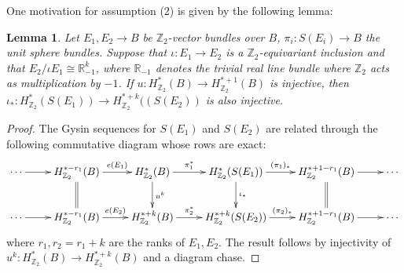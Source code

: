 \documentclass{amsart}
\newtheorem{lemma}[theorem]{Lemma}
\theoremstyle{definition}
\theoremstyle{remark}
\numberwithin{equation}{section}
\begin{document}
One motivation for assumption (2) is given by the following lemma:

\begin{lemma}\label{lem:inj}
Let $E_1,E_2 \to B$ be $\mathbb{Z}_2$-vector bundles over $B$, $\pi_i : S(E_i) \to B$ the unit sphere bundles. Suppose that $\iota : E_1 \to E_2$ is a $\mathbb{Z}_2$-equivariant inclusion and that $E_2/\iota E_1 \cong \mathbb{R}_{-1}^k$, where $\mathbb{R}_{-1}$ denotes the trivial real line bundle where $\mathbb{Z}_2$ acts as multiplication by $-1$. If $u : H^*_{\mathbb{Z}_2}(B) \to H^{*+1}_{\mathbb{Z}_2}(B)$ is injective, then $\iota_* : H^*_{\mathbb{Z}_2}( S(E_1) ) \to H^{*+k}_{\mathbb{Z}_2}( (S(E_2) )$ is also injective.
\end{lemma}
\begin{proof}
The Gysin sequences for $S(E_1)$ and $S(E_2)$ are related through the following commutative diagram whose rows are exact:
\[
\xymatrix{
\cdots \ar[r] & H^{*-r_1}_{\mathbb{Z}_2}(B) \ar[r]^-{ e(E_1) } \ar@{=}[d] & H^*_{\mathbb{Z}_2}(B) \ar[r]^-{\pi_1^*} \ar[d]^{u^k} & H^*_{\mathbb{Z}_2}( S(E_1) ) \ar[r]^-{(\pi_1)_*} \ar[d]^{\iota_*} & H^{*+1-r_1}_{\mathbb{Z}_2}(B) \ar[r] \ar@{=}[d] & \cdots \\
\cdots \ar[r] & H^{*-r_1}_{\mathbb{Z}_2}(B) \ar[r]^-{e(E_2)} & H^{*+k}_{\mathbb{Z}_2}(B) \ar[r]^-{\pi_2^*} & H^{*+k}_{\mathbb{Z}_2}( S(E_2)) \ar[r]^-{(\pi_2)_*} &
H^{*+1-r_1}_{\mathbb{Z}_2}(B) \ar[r] & \cdots
}
\]
where $r_1,r_2=r_1+k$ are the ranks of $E_1, E_2$. The result follows by injectivity of $u^k : H^*_{\mathbb{Z}_2}(B) \to H^{*+k}_{\mathbb{Z}_2}(B)$ and a diagram chase.
\end{proof}
\end{document}
